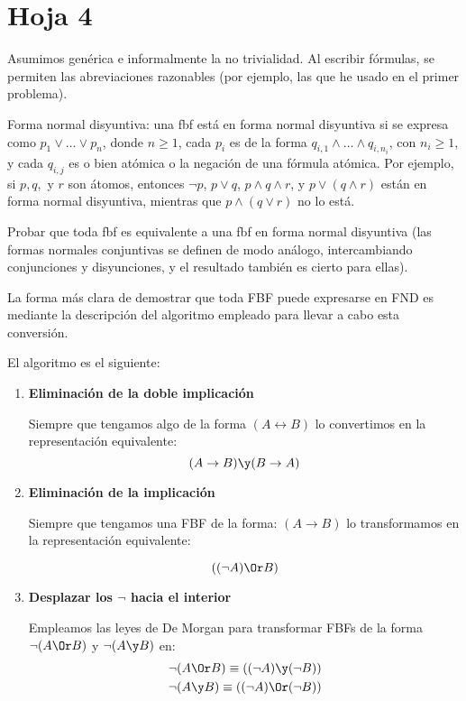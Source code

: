 \section{Hoja 4}

Asumimos gen\'erica e informalmente la no trivialidad. Al escribir f\'ormulas, se permiten
las abreviaciones razonables (por ejemplo, las que he usado en el primer problema).

\begin{problem}[1]
Forma normal disyuntiva: una fbf est\'a en forma normal
disyuntiva si se expresa como $p_1 \vee \dots \vee p_n$,
donde $n\ge1$,  cada $p_i$ es de la forma
$q_{i, 1} \wedge \dots \wedge q_{i,n_i}$, con $n_i\ge1$,
y cada $q_{i, j}$ es o bien at\'omica o la negaci\'on de una f\'ormula at\'omica.
Por ejemplo, si $p, q, $ y $r$ son \'atomos, entonces $\neg p$, $p\vee q$,
$p \wedge q \wedge r$, y  $p \vee (q \wedge r)$ est\'an en forma normal disyuntiva,
mientras que  $p \wedge (q \vee r)$ no lo est\'a.

Probar que toda fbf
es equivalente a una fbf en forma normal disyuntiva (las formas
normales conjuntivas se definen de modo an\'alogo, intercambiando conjunciones
y disyunciones, y el resultado tambi\'en es cierto para ellas).

\solution

La forma más clara de demostrar que toda FBF puede expresarse en FND es mediante la descripción del algoritmo empleado para llevar a cabo esta conversión.

El algoritmo es el siguiente:
\begin{enumerate}
\item \textbf{Eliminación de la doble implicación}

Siempre que tengamos algo de la forma $(A \leftrightarrow B)$ lo convertimos en la representación equivalente:
\[(A \to B) \y (B \to A)\]

\item \textbf{Eliminación de la implicación}

Siempre que tengamos una FBF de la forma: $(A \to B)$ lo transformamos en la representación equivalente:

\[((\neg A) \Or B)\]

\item \textbf{Desplazar los $\neg$ hacia el interior}

Empleamos las leyes de De Morgan para transformar FBFs de la forma $\neg(A \Or B)$ y $\neg(A \y B)$ en:
\begin{gather*}
\neg(A \Or B) \equiv ((\neg A) \y (\neg B))\\
\neg(A \y B) \equiv ((\neg A) \Or (\neg B))
\end{gather*}


\end{enumerate}
\end{problem}

